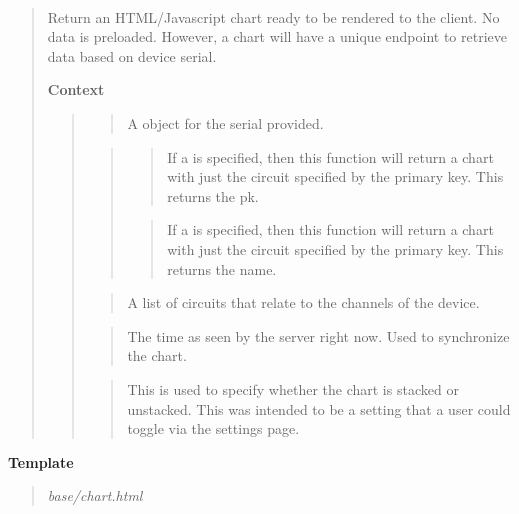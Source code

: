 \documentclass[letterpaper,10pt,english]{sphinxmanual}
\begin{document}
\begin{fulllineitems}
\label{modules/webapp:webapp.views.device_chart}~\begin{quote}

Return an HTML/Javascript chart ready to be rendered to the client.
No data is preloaded. However, a chart will have a unique endpoint
to retrieve data based on device serial.

\textbf{Context}
\begin{quote}

\begin{quote}

A {\hyperref[modules/microdata:microdata.models.Device]{\emph{}}} object for the serial provided.
\end{quote}

\begin{quote}
\begin{quote}

If a  is specified, then this function will return a chart
with just the circuit specified by the primary key. This returns the pk.
\end{quote}

\begin{quote}

If a  is specified, then this function will return a chart
with just the circuit specified by the primary key. This returns the name.
\end{quote}
\end{quote}

\begin{quote}

A list of circuits that relate to the channels of the device.
\end{quote}

\begin{quote}

The time as seen by the server right now. Used to synchronize the chart.
\end{quote}

\begin{quote}

This is used to specify whether the chart is stacked or unstacked. This
was intended to be a setting that a user could toggle via the settings page.
\end{quote}
\end{quote}
\end{quote}

\textbf{Template}
\begin{quote}

\emph{base/chart.html}
\end{quote}

\end{fulllineitems}
\end{document}
